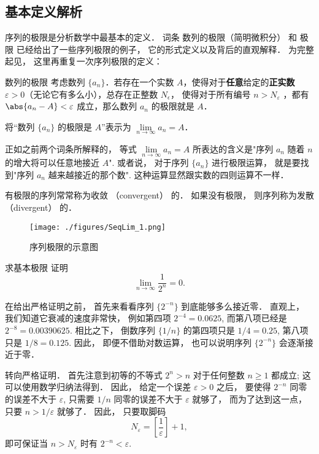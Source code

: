 
\begin{issues}
\end{issues}


\subsection{基本定义解析}

序列的极限是分析数学中最基本的定义． 词条 数列的极限（简明微积分） 和 极限 已经给出了一些序列极限的例子， 它的形式定义以及背后的直观解释． 为完整起见， 这里再重复一次序列极限的定义：

\begin{definition}{数列的极限}
考虑数列 $\{a_n\}$．若存在一个实数 $A$，使得对于\textbf{任意}给定的\textbf{正实数} $\varepsilon > 0$（无论它有多么小），总存在正整数 $N_\epsilon$， 使得对于所有编号 $n>N_\varepsilon$ ，都有 $\abs{a_n - A} < \varepsilon$ 成立，那么数列 $a_n$ 的极限就是 $A$．

将“数列 $\{a_n\}$ 的极限是 $A$”表示为 $\lim\limits_{n\to\infty}a_n=A$．
\end{definition}

正如之前两个词条所解释的， 等式 $\lim\limits_{n\to\infty}a_n=A$ 所表达的含义是"序列 $a_n$ 随着 $n$ 的增大将可以任意地接近 $A$". 或者说， 对于序列 $\{a_n\}$ 进行极限运算， 就是要找到"序列 $a_n$ 越来越接近的那个数". 这种运算显然跟实数的四则运算不一样．

有极限的序列常常称为收敛 （convergent） 的． 如果没有极限， 则序列称为发散 （divergent） 的．
\begin{figure}[ht]
\centering
\texttt{[image: ./figures/SeqLim\_1.png]}
\caption{序列极限的示意图} \label{SeqLim_fig1}
\end{figure}
\begin{example}{求基本极限}
证明$$\lim\limits_{n\to\infty}\frac{1}{2^n}=0.$$

在给出严格证明之前， 首先来看看序列 $\{2^{-n}\}$ 到底能够多么接近零． 直观上， 我们知道它衰减的速度非常快， 例如第四项 $2^{-4}=0.0625$, 而第八项已经是 $2^{-8}=0.00390625$. 相比之下， 倒数序列 $\{1/n\}$ 的第四项只是 $1/4=0.25$, 第八项只是 $1/8=0.125$. 因此， 即便不借助对数运算， 也可以说明序列 $\{2^{-n}\}$ 会逐渐接近于零．

转向严格证明． 首先注意到初等的不等式 $2^n>n$ 对于任何整数 $n\geq1$ 都成立; 这可以使用数学归纳法得到． 因此， 给定一个误差 $\varepsilon>0$ 之后， 要使得 $2^{-n}$ 同零的误差不大于 $\varepsilon$, 只需要 $1/n$ 同零的误差不大于 $\varepsilon$ 就够了， 而为了达到这一点， 只要 $n>1/\varepsilon$ 就够了． 因此， 只要取脚码
$$
N_\varepsilon=\left[\frac{1}{\varepsilon}\right]+1,
$$
即可保证当 $n>N_\varepsilon$ 时有 $2^{-n}<\varepsilon$.
\end{example}

